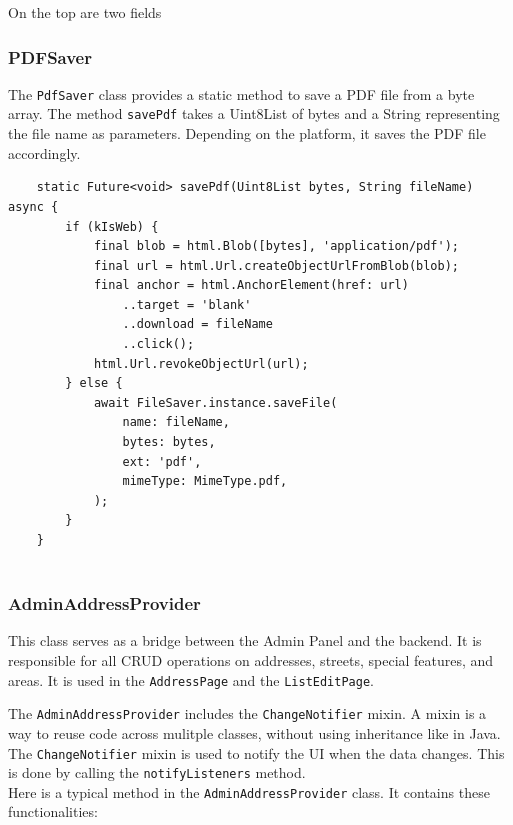 On the top are two fields 

\subsubsection{PDFSaver}
The \texttt{PdfSaver} class provides a static method to save a PDF file from a byte array. The method \texttt{savePdf} takes a Uint8List of bytes and a String representing the file name as parameters. Depending on the platform, it saves the PDF file accordingly.\\


\lstset{style=mycsharp, caption=savePdf method in PDFSaver}
\begin{lstlisting}
    static Future<void> savePdf(Uint8List bytes, String fileName) async {
        if (kIsWeb) {
            final blob = html.Blob([bytes], 'application/pdf');
            final url = html.Url.createObjectUrlFromBlob(blob);
            final anchor = html.AnchorElement(href: url)
                ..target = 'blank'
                ..download = fileName
                ..click();
            html.Url.revokeObjectUrl(url);
        } else {
            await FileSaver.instance.saveFile(
                name: fileName,
                bytes: bytes,
                ext: 'pdf',
                mimeType: MimeType.pdf,
            );
        }
    }
    
\end{lstlisting}
  \subsubsection{AdminAddressProvider}
This class serves as a bridge between the Admin Panel and the backend. It is responsible for all CRUD operations on addresses, streets, special features, and areas. It is used in the \texttt{AddressPage} and the \texttt{ListEditPage}. 

The \texttt{AdminAddressProvider} includes the \texttt{ChangeNotifier} mixin. A mixin is a way to reuse code across mulitple classes, without using inheritance like in Java.\autocite{dart.dev} The \texttt{ChangeNotifier} mixin is used to notify the UI when the data changes. \autocite{flutter.dev} This is done by calling the \texttt{notifyListeners} method.\\

Here is a typical method in the \texttt{AdminAddressProvider} class. It contains these functionalities:

